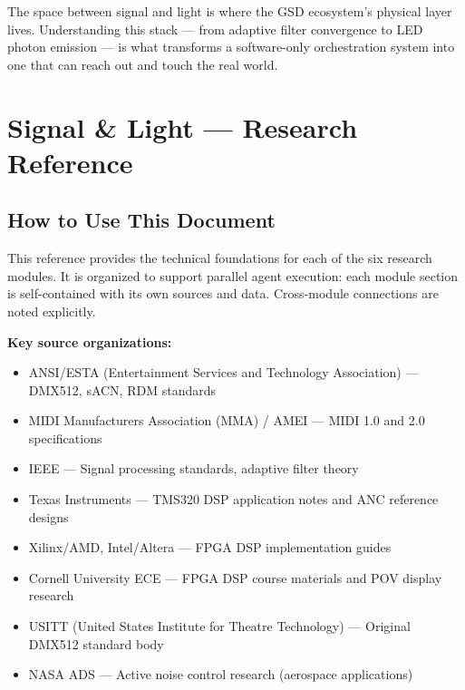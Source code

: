 \documentclass[11pt,letterpaper]{article}
\newcommand{\stageheader}[2]{%
  \noindent\colorbox{#2}{\makebox[\textwidth][l]{%
    \textcolor{white}{\bfseries\sffamily\hspace{6pt}#1\hspace{6pt}}}}%
  \vspace{0.5em}\par%
}
\begin{document}
The space between signal and light is where the GSD ecosystem's physical layer lives. Understanding this stack --- from adaptive filter convergence to LED photon emission --- is what transforms a software-only orchestration system into one that can reach out and touch the real world.

\newpage

\stageheader{STAGE 2 --- RESEARCH REFERENCE}{secondary}

\section{Signal \& Light --- Research Reference}

\subsection{How to Use This Document}

This reference provides the technical foundations for each of the six research modules. It is organized to support parallel agent execution: each module section is self-contained with its own sources and data. Cross-module connections are noted explicitly.

\textbf{Key source organizations:}

\begin{itemize}[leftmargin=2em]
\item ANSI/ESTA (Entertainment Services and Technology Association) --- DMX512, sACN, RDM standards
\item MIDI Manufacturers Association (MMA) / AMEI --- MIDI 1.0 and 2.0 specifications
\item IEEE --- Signal processing standards, adaptive filter theory
\item Texas Instruments --- TMS320 DSP application notes and ANC reference designs
\item Xilinx/AMD, Intel/Altera --- FPGA DSP implementation guides
\item Cornell University ECE --- FPGA DSP course materials and POV display research
\item USITT (United States Institute for Theatre Technology) --- Original DMX512 standard body
\item NASA ADS --- Active noise control research (aerospace applications)
\end{itemize}
\end{document}
